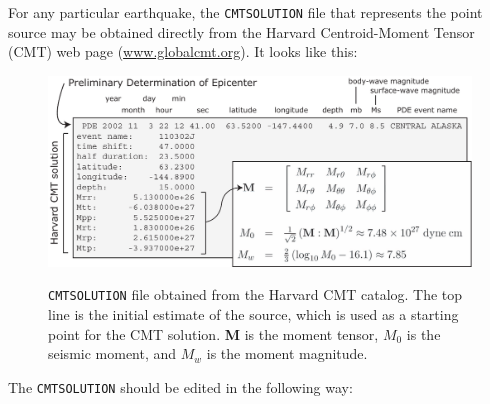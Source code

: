 \documentclass[oneside,english]{book}
\newenvironment{lyxcode}
{\begin{list}{}{
\setlength{\rightmargin}{\leftmargin}
\setlength{\listparindent}{0pt}%
\raggedright
\setlength{\itemsep}{0pt}
\setlength{\parsep}{0pt}
\normalfont\ttfamily}%
 \item[]}
{\end{list}}
\newcommand{\urlwithparentheses}[1]{(\url{#1})}
\begin{document}
For any particular earthquake, the \texttt{CMTSOLUTION} file that
represents the point source may be obtained directly from the Harvard Centroid-Moment Tensor (CMT) web page \urlwithparentheses{www.globalcmt.org}.
It looks like this:

\begin{lyxcode}
{\small }%
\begin{figure}[H]
\noindent \begin{centering}
{\small \includegraphics[width=1\textwidth]{figures/Denali_CMT} }
\par\end{centering}{\small \par}

\caption{\texttt{CMTSOLUTION} file obtained from the Harvard CMT catalog. The
top line is the initial estimate of the source, which is used as a
starting point for the CMT solution. \textbf{M} is the moment tensor,
$M_{0}${\small{} }is the seismic moment, and $M_{w}$ is the moment
magnitude.}


\label{fig:CMTSOLUTION-file}
\end{figure}
{\small \par}
\end{lyxcode}
The \texttt{CMTSOLUTION} should be edited in the following way:
\end{document}
